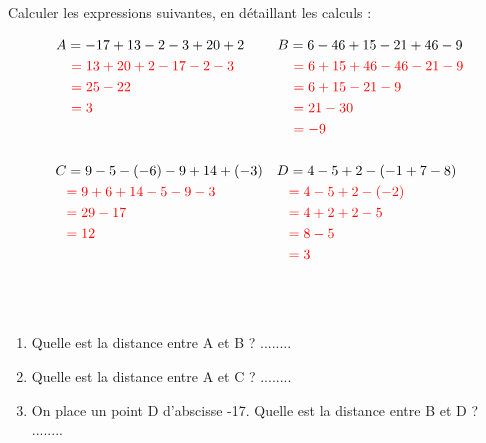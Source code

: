 \documentclass[Controlev2-correction]{subfiles}
\begin{document}
\begin{exercice}[(8 points)] Calculer les expressions suivantes, en détaillant les calculs :

	\begin{align*}
		A & = -17 + 13 - 2 - 3 + 20 + 2               & B & = 6 - 46 + 15 - 21 + 46 - 9                \\
		  & \ \correction{= 13 + 20 + 2 - 17 - 2 - 3} &   & \ \correction{= 6 + 15 + 46 - 46 - 21 - 9} \\
		  & \ \correction{= 25 - 22}                  &   & \ \correction{= 6 + 15 - 21 - 9}           \\
		  & \ \correction{= 3}                        &   & \ \correction{= 21 - 30}                   \\
		  &                                           &   & \ \correction{= -9}                        \\
		\\
		C & = 9 - 5 - (-6) - 9 + 14 + (-3)            & D & = 4 - 5 + 2 - (-1 + 7 - 8)                 \\
		  & \correction{= 9 + 6 + 14 - 5 - 9 - 3}     &   & \correction{= 4 - 5 + 2 - (-2)}            \\
		  & \correction{= 29 - 17}                    &   & \correction{= 4 + 2 + 2 - 5}               \\
		  & \correction{= 12}                         &   & \correction{= 8 - 5}                       \\
		  &                                           &   & \correction{= 3}                           \\
		\\
	\end{align*}
\end{exercice}

\begin{exercice}[(3 points)]\

	\begin{center}
	\end{center}

	\begin{enumerate}
		\item Quelle est la distance entre A et B ? ........
		\item Quelle est la distance entre A et C ? ........
		\item On place un point D d'abscisse -17. Quelle est la distance entre B et D ? ........
	\end{enumerate}
\end{exercice}
\end{document}
